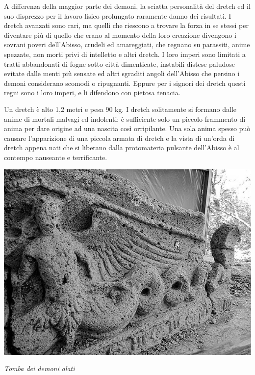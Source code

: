 \begin{multicols}{2}
{A differenza della maggior parte dei demoni, la sciatta personalità del dretch ed il suo disprezzo per il lavoro fisico prolungato raramente danno dei risultati. I dretch avanzati sono rari, ma quelli che riescono a trovare la forza in se stessi per diventare più di quello che erano al momento della loro creazione divengono i sovrani poveri dell'Abisso, crudeli ed amareggiati, che regnano su parassiti, anime spezzate, non morti privi di intelletto e altri dretch. I loro imperi sono limitati a tratti abbandonati di fogne sotto città dimenticate, instabili distese paludose evitate dalle menti più sensate ed altri sgraditi angoli dell'Abisso che persino i demoni considerano scomodi o ripugnanti. Eppure per i signori dei dretch questi regni sono i loro imperi, e li difendono con pietosa tenacia.

Un dretch è alto 1,2 metri e pesa 90 kg. I dretch solitamente si formano dalle anime di mortali malvagi ed indolenti: è sufficiente solo un piccolo frammento di anima per dare origine ad una nascita così orripilante. Una sola anima spesso può causare l'apparizione di una piccola armata di dretch e la vista di un'orda di dretch appena nati che si liberano dalla protomateria pulsante dell'Abisso è al contempo nauseante e terrificante.


\begin{center}
	\includegraphics[width=0.9\linewidth]{immagini/Demone_Alato.png}

	\emph{Tomba dei demoni alati}
\end{center}

}
\end{multicols}
